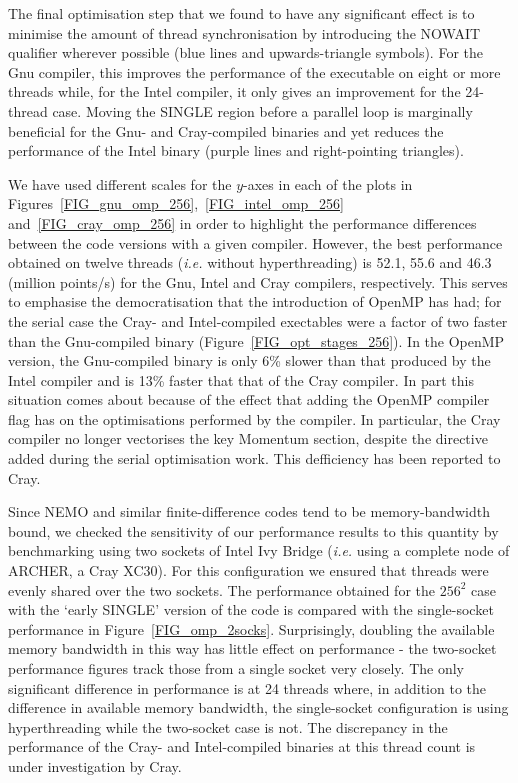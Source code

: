 \documentclass[gmdd, manuscript]{copernicus}
\begin{document}
The final optimisation step that we found to have any significant
effect is to minimise the amount of thread synchronisation by
introducing the NOWAIT qualifier wherever possible (blue lines and
upwards-triangle symbols). For the Gnu compiler, this improves the
performance of the executable on eight or more threads while, for the
Intel compiler, it only gives an improvement for the 24-thread
case. Moving the SINGLE region before a parallel loop is marginally
beneficial for the Gnu- and Cray-compiled binaries and yet reduces the
performance of the Intel binary (purple lines and right-pointing
triangles).

We have used different scales for the $y$-axes in each of the plots in
Figures~\ref{FIG_gnu_omp_256},~\ref{FIG_intel_omp_256}
and~\ref{FIG_cray_omp_256} in order to highlight the performance
differences between the code versions with a given compiler. However,
the best performance obtained on twelve threads (\textit{i.e.}  without
hyperthreading) is 52.1, 55.6 and 46.3 (million points/s) for the Gnu,
Intel and Cray compilers, respectively. This serves to emphasise the
democratisation that the introduction of OpenMP has had; for the
serial case the Cray- and Intel-compiled exectables were a factor of
two faster than the Gnu-compiled binary
(Figure~\ref{FIG_opt_stages_256}). In the OpenMP version, the
Gnu-compiled binary is only 6\% slower than that produced by the Intel
compiler and is 13\% faster that that of the Cray compiler. In
part this situation comes about because of the effect that adding the
OpenMP compiler flag has on the optimisations performed by the
compiler.  In particular, the Cray compiler no longer vectorises the
key Momentum section, despite the directive added during the serial
optimisation work. This defficiency has been reported to Cray.

Since NEMO and similar finite-difference codes tend to be
memory-bandwidth bound, we checked the sensitivity of our performance
results to this quantity by benchmarking using two sockets of Intel
Ivy Bridge (\textit{i.e.} using a complete node of ARCHER, a Cray
XC30). For this configuration we ensured that threads were evenly
shared over the two sockets. The performance obtained for the $256^2$
case with the `early SINGLE' version of the code is compared with the
single-socket performance in
Figure~\ref{FIG_omp_2socks}. Surprisingly, doubling the available
memory bandwidth in this way has little effect on performance - the
two-socket performance figures track those from a single socket very
closely. The only significant difference in performance is at 24
threads where, in addition to the difference in available memory
bandwidth, the single-socket configuration is using hyperthreading
while the two-socket case is not.  The discrepancy in the performance
of the Cray- and Intel-compiled binaries at this thread count is under
investigation by Cray.
\end{document}
